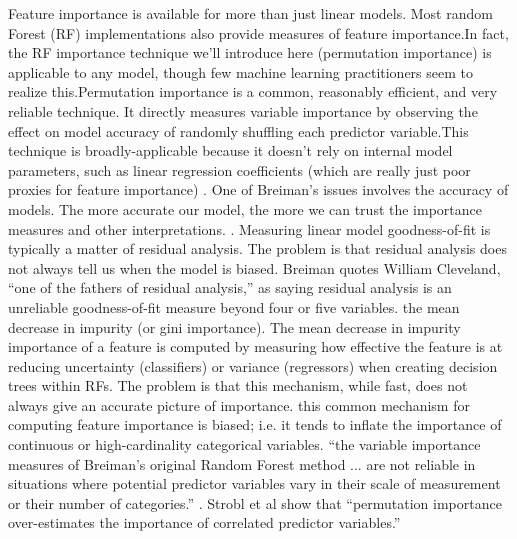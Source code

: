 \documentclass[preprint,12pt]{elsarticle}
\begin{document}
Feature importance is available for more than just linear models. Most random Forest (RF) implementations also provide measures of feature importance.In fact, the RF importance technique we'll introduce here (permutation importance) is applicable to any model, though few machine learning practitioners seem to realize this.Permutation importance is a common, reasonably efficient, and very reliable technique. It directly measures variable importance by observing the effect on model accuracy of randomly shuffling each predictor variable.This technique is broadly-applicable because it doesn't rely on internal model parameters, such as linear regression coefficients (which are really just poor proxies for feature importance) \cite{breiman2001statistical}. 
One of Breiman's issues involves the accuracy of models. The more accurate our model, the more we can trust the importance measures and other interpretations. . Measuring linear model goodness-of-fit is typically a matter of residual analysis. The problem is that residual analysis does not always tell us when the model is biased. Breiman quotes William Cleveland, “one of the fathers of residual analysis,” as saying residual analysis is an unreliable goodness-of-fit measure beyond four or five variables. 
the mean decrease in impurity (or gini importance). The mean decrease in impurity importance of a feature is computed by measuring how effective the feature is at reducing uncertainty (classifiers) or variance (regressors) when creating decision trees within RFs.  The problem is that this mechanism, while fast, does not always give an accurate picture of importance. this common mechanism for computing feature importance is biased; i.e. it tends to inflate the importance of continuous or high-cardinality categorical variables. “the variable importance measures of Breiman's original Random Forest method ... are not reliable in situations where potential predictor variables vary in their scale of measurement or their number of categories.” \cite{strobl2007bias}. Strobl et al show that “permutation importance over-estimates the importance of correlated predictor variables.”
\end{document}
